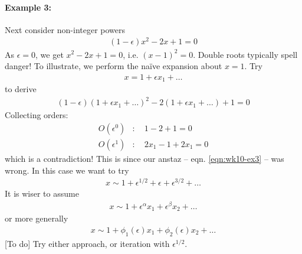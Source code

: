 \paragraph{Example 3:} Next consider non-integer powers
\begin{gather*}
	(1-\epsilon)x^2 - 2x+1 = 0
\end{gather*}
As $\epsilon = 0$, we get $x^2 - 2x+1 = 0$, i.e. $(x-1)^2 = 0$. Double roots typically spell danger! To illustrate, we perform the na\"{i}ve expansion about $x=1$. Try
\begin{gather}
	x = 1 + \epsilon x_1 + \dots \label{eqn:wk10-ex3}
\end{gather}
to derive
\begin{align*}
	(1-\epsilon)(1+\epsilon x_1 + \dots)^2 - 2(1+ \epsilon x_1 + \dots ) + 1 = 0
\end{align*}
Collecting orders:
\begin{align*}
	O(\epsilon^0) &: \quad 1 - 2+1 = 0 \\
	O(\epsilon^1) &: \quad 2x_1 - 1 + 2x_1 = 0
\end{align*}
which is a contradiction! This is since our anstaz -- eqn. \ref{eqn:wk10-ex3} -- was wrong. In this case we want to try 
\begin{gather*}
	x \sim 1 + \epsilon^{1/2} + \epsilon + \epsilon^{3/2} + \dots 
\end{gather*}
It is wiser to assume
\begin{gather*}
	x \sim 1 + \epsilon^\alpha x_1 + \epsilon^\beta x_2 + \dots 
\end{gather*}
or more generally 
\begin{gather*}
	x \sim 1 + \phi_1(\epsilon)x_1 + \phi_2 (\epsilon)x_2 + \dots 
\end{gather*}
{\color{red} [To do]} Try either approach, or iteration with $\epsilon^{1/2}$.

